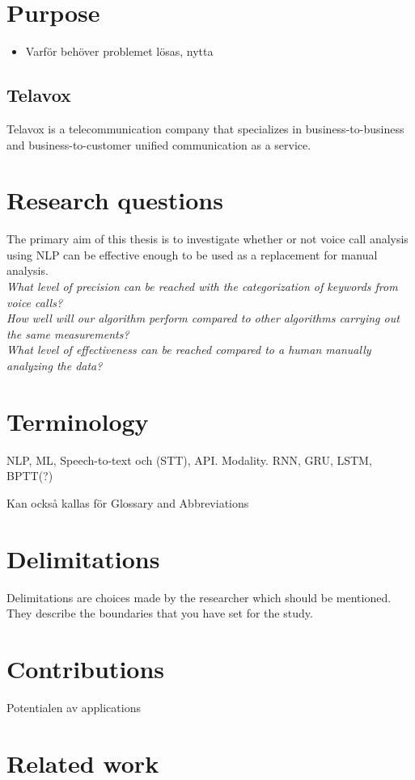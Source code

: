 \documentclass[nofilelist]{cslthse-msc}
\begin{document}
\section{Purpose}
\begin{itemize}
    \item Varför behöver problemet lösas, nytta
\end{itemize}
\subsection{Telavox}
Telavox is a telecommunication company that specializes in business-to-business and business-to-customer unified communication as a service. 
\section{Research questions}
The primary aim of this thesis is to investigate whether or not voice call analysis using NLP can be effective enough to be used as a replacement for manual analysis. \\
\textit{What level of precision can be reached with the categorization of keywords from voice calls?}\\
\textit{How well will our algorithm perform compared to other algorithms carrying out the same measurements?}\\
\textit{What level of effectiveness can be reached compared to a human manually analyzing the data?} 

\section{Terminology}
NLP, ML, Speech-to-text och (STT), API. Modality. RNN, GRU, LSTM, BPTT(?) 

Kan också kallas för Glossary and Abbreviations
\section{Delimitations}
Delimitations are choices made by the researcher which should be mentioned. They describe the boundaries that you have set for the study.
\section{Contributions}
Potentialen av applications 
\section{Related work}
\end{document}
